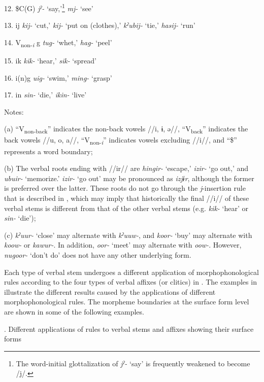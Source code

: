 12.  \$C(G)  \textit{jˀ-} ‘say,’\footnote{The word-initial glottalization of \textit{jˀ-} ‘say’ is frequently weakened to become /j/.} \textit{mj-} ‘see’

13.  ij  \textit{kij-} ‘cut,’ \textit{kij-} ‘put on (clothes),’ \textit{kˀubij-} ‘tie,’ \textit{hasij-} ‘run’

14.  V\textsubscript{non-}\textit{\textsubscript{i} }g  \textit{tug-} ‘whet,’ \textit{hag-} ‘peel’

15.  ik  \textit{kik-} ‘hear,’ \textit{sik-} ‘spread’

16.  i(n)g  \textit{uig-} ‘swim,’ \textit{ming-} ‘grasp’

17.  in  \textit{sin-} ‘die,’ \textit{ikin-} ‘live’

Notes:

(a) “V\textsubscript{non-back}” indicates the non-back vowels //i, ɨ, ə//, “V\textsubscript{back}” indicates the back vowels //u, o, a//, “V\textsubscript{non-}\textit{\textsubscript{i}}” indicates vowels excluding //i//, and “\$” represents a word boundary;

(b) The verbal roots ending with //ir// are \textit{hingir-} ‘escape,’ \textit{izir-} ‘go out,’ and \textit{ubuir-} ‘memorize.’ \textit{izir-} ‘go out’ may be pronounced as \textit{izjɨr}, although the former is preferred over the latter. These roots do not go through the \textit{j}{}-insertion rule that is described in , which may imply that historically the final //i// of these verbal stems is different from that of the other verbal stems (e.g. \textit{kik-} ‘hear’ or \textit{sin-} ‘die’);

\begin{styleFootnote}
(c) \textit{kˀuur-} ‘close’ may alternate with \textit{kˀuuw-}, and \textit{koor-} ‘buy’ may alternate with \textit{koow-} or \textit{kawur-}. In addition, \textit{oor-} ‘meet’ may alternate with \textit{oow-}. However, \textit{nugoor-} ‘don’t do’ does not have any other underlying form.
\end{styleFootnote}

Each type of verbal stem undergoes a different application of morphophonological rules according to the four types of verbal affixes (or clitics) in . The examples in  illustrate the different results caused by the applications of different morphophonological rules. The morpheme boundaries at the surface form level are shown in some of the following examples.

\begin{styleBeschriftung}
\textmd{}\textmd{. Different applications of rules to verbal stems and affixes showing their surface forms}
\end{styleBeschriftung}

